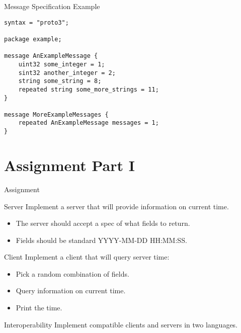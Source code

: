\begin{frame}[fragile]{Message Specification Example}
\begin{lstlisting}[style=mini]
syntax = "proto3";

package example;

message AnExampleMessage {
    uint32 some_integer = 1;
    sint32 another_integer = 2;
    string some_string = 8;
    repeated string some_more_strings = 11;
}

message MoreExampleMessages {
    repeated AnExampleMessage messages = 1;
}
\end{lstlisting}
\end{frame}




\section{Assignment Part I}


\begin{frame}{Assignment}
    \begin{block}{Server}
        Implement a server that will provide information on current time.
        \begin{itemize}
            \item The server should accept a spec of what fields to return.
            \item Fields should be standard YYYY-MM-DD HH:MM:SS.
        \end{itemize}
    \end{block}

    \begin{block}{Client}
        Implement a client that will query server time:
        \begin{itemize}
            \item Pick a random combination of fields.
            \item Query information on current time.
            \item Print the time.
        \end{itemize}
    \end{block}

    \begin{block}{Interoperability}
        Implement compatible clients and servers in two languages.
    \end{block}
\end{frame}


